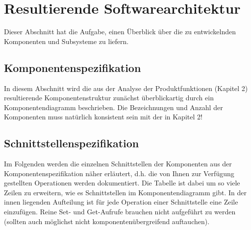 \chapter{Resultierende Softwarearchitektur}

Dieser Abschnitt hat die Aufgabe, einen Überblick über die zu entwickelnden
Komponenten und Subsysteme zu liefern.
\section{Komponentenspezifikation}

In diesem Abschnitt wird die aus der Analyse der Produktfunktionen (Kapitel 2)
resultierende Komponentenstruktur zunächst überblickartig durch ein
Komponentendiagramm beschrieben. Die Bezeichnungen und Anzahl der Komponenten
muss natürlich konsistent sein mit der in Kapitel 2!

\section{Schnittstellenspezifikation}

Im Folgenden werden die einzelnen Schnittstellen der Komponenten aus der
Komponentenspezifikation näher erläutert, d.h. die von Ihnen zur Verfügung
gestellten Operationen werden dokumentiert. Die Tabelle ist dabei um so viele
Zeilen zu erweitern, wie es Schnittstellen im Komponentendiagramm gibt. In der
innen liegenden Aufteilung ist für jede Operation einer Schnittstelle eine
Zeile einzufügen.  Reine Set- und Get-Aufrufe brauchen nicht aufgeführt zu
werden (sollten auch möglichst nicht komponentenübergreifend auftauchen).

